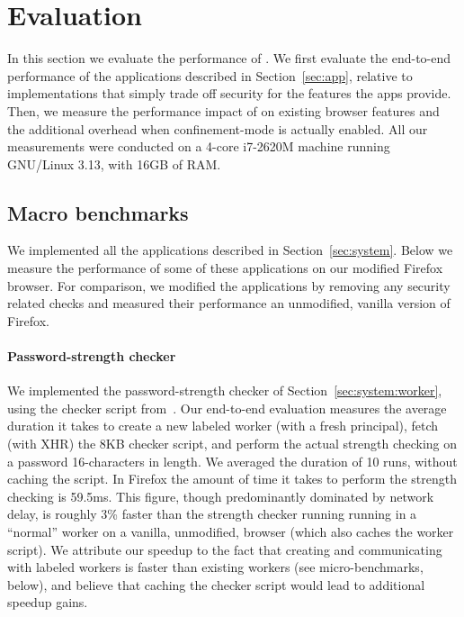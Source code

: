 \section{Evaluation}
\label{sec:eval}

In this section we evaluate the performance of \sys{}.
%
We first evaluate the end-to-end performance of the
applications described in Section~\ref{sec:app}, relative to
implementations that simply trade off security for the features the
apps provide.
%
Then, we measure the performance impact of \sys{} on existing browser
features and the additional overhead when confinement-mode is actually
enabled.
%
All our measurements were conducted on a 4-core i7-2620M machine
running GNU/Linux 3.13, with 16GB of RAM.
%


\subsection{Macro benchmarks}
\label{sec:eval:macro}

We implemented all the applications described in
Section~\ref{sec:system}.
%
Below we measure the performance of some of these applications on our
modified Firefox browser.
%
For comparison, we modified the applications by removing any security
related checks and measured their performance an unmodified, vanilla
version of Firefox.

\paragraph{Password-strength checker}
%
We implemented the password-strength checker of
Section~\ref{sec:system:worker}, using the checker script
from~\cite{checker1}.
%
Our end-to-end evaluation measures the average duration it takes to
create a new labeled worker (with a fresh principal), fetch (with XHR)
the 8KB checker script, and perform the actual strength
checking on a password 16-characters in length.
%
We averaged the duration of 10 runs, without caching the script.
%
In Firefox the amount of time it takes to perform the strength
checking is 59.5ms.
%
This figure, though predominantly dominated by network delay, is
roughly 3\% faster than the strength checker running running in a
``normal'' worker on a vanilla, unmodified, browser (which
also caches the worker script).
%
We attribute our speedup to the fact that creating and communicating
with labeled workers is faster than existing workers (see
micro-benchmarks, below), and believe that caching the checker script
would lead to additional speedup gains.


